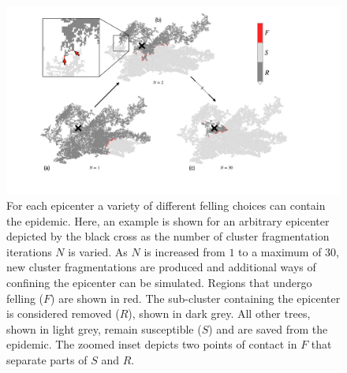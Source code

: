 \begin{figure}
    \centering
    \includegraphics[scale=0.35]{chapter5/figures/figure6_.pdf}
    \caption{For each epicenter a variety of different felling choices can contain the epidemic. Here, an example is shown for an arbitrary epicenter depicted by the black cross as the number of cluster fragmentation iterations $N$ is varied. As $N$ is increased from $\mathrm{1}$ to a maximum of $\mathrm{30}$, new cluster fragmentations are produced and additional ways of confining the epicenter can be simulated. Regions that undergo felling ($F$) are shown in red. The sub-cluster containing the epicenter is considered removed ($R$), shown in dark grey. All other trees, shown in light grey, remain susceptible ($S$) and are saved from the epidemic. The zoomed inset depicts two points of contact in $F$ that separate parts of $S$ and $R$.}
    \label{fig:scenario-expo}
\end{figure}{}

